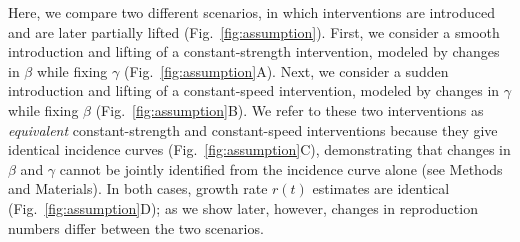 \documentclass[12pt]{article}
\newcommand{\fref}[1]{Fig.~\ref{fig:#1}}
\begin{document}
Here, we compare two different scenarios, in which interventions are introduced and are later partially lifted (\fref{assumption}).
First, we consider a smooth introduction and lifting of a constant-strength intervention, modeled by changes in $\beta$ while fixing $\gamma$ (\fref{assumption}A).
Next, we consider a sudden introduction and lifting of a constant-speed intervention, modeled by changes in $\gamma$ while fixing $\beta$ (\fref{assumption}B).
We refer to these two interventions as \emph{equivalent} constant-strength and constant-speed interventions because they give identical incidence curves (\fref{assumption}C), demonstrating that changes in $\beta$ and $\gamma$ cannot be jointly identified from the incidence curve alone (see Methods and Materials).
In both cases, growth rate $r(t)$ estimates are identical (\fref{assumption}D); as we show later, however, changes in reproduction numbers differ between the two scenarios.
\end{document}
